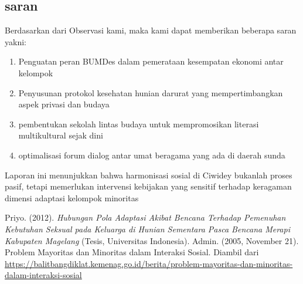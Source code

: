\documentclass[a4paper,12pt, left=3cm,right=2cm,bottom=2cm, bahasa]{article}
\begin{document}
\subsection{saran}
Berdasarkan dari Observasi kami, maka kami dapat memberikan beberapa saran yakni:
\begin{enumerate}
  \item Penguatan peran BUMDes dalam pemerataan kesempatan ekonomi antar kelompok
  \item Penyusunan protokol kesehatan hunian darurat yang mempertimbangkan aspek privasi dan budaya
  \item pembentukan sekolah lintas budaya untuk mempromosikan literasi multikultural sejak dini 
  \item optimalisasi forum dialog antar umat beragama yang ada di daerah sunda 
\end{enumerate}
Laporan ini menunjukkan bahwa harmonisasi sosial di Ciwidey bukanlah proses pasif, tetapi memerlukan intervensi kebijakan yang sensitif terhadap keragaman dimensi adaptasi kelompok minoritas
\begin{thebibliography}{1}

Priyo. (2012). \textit{Hubungan Pola Adaptasi Akibat Bencana Terhadap Pemenuhan Kebutuhan Seksual pada Keluarga di Hunian Sementara Pasca Bencana Merapi Kabupaten Magelang} (Tesis, Universitas Indonesia).
Admin. (2005, November 21). Problem Mayoritas dan Minoritas dalam Interaksi Sosial. Diambil dari \url{https://balitbangdiklat.kemenag.go.id/berita/problem-mayoritas-dan-minoritas-dalam-interaksi-sosial}

\end{thebibliography}
\end{document}
